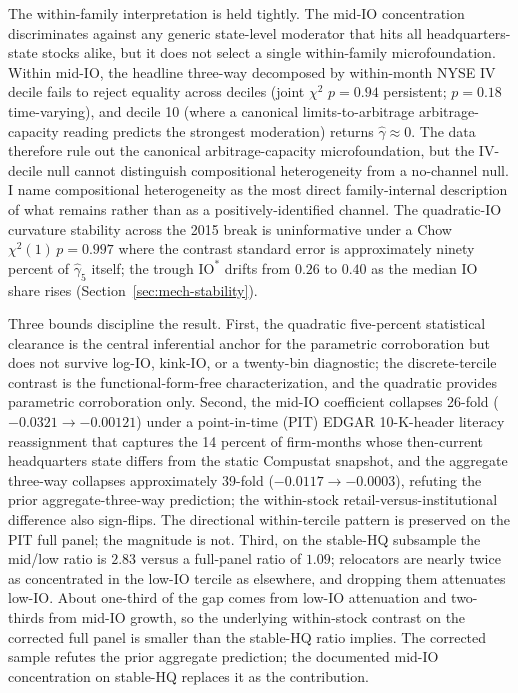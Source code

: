 The within-family interpretation is held tightly. The mid-IO concentration discriminates against any generic state-level moderator that hits all headquarters-state stocks alike, but it does not select a single within-family microfoundation. Within mid-IO, the headline three-way decomposed by within-month NYSE IV decile fails to reject equality across deciles (joint $\chi^{2}$ $p = 0.94$ persistent; $p = 0.18$ time-varying), and decile 10 (where a canonical limits-to-arbitrage arbitrage-capacity reading predicts the strongest moderation) returns $\hat\gamma \approx 0$. The data therefore rule out the canonical arbitrage-capacity microfoundation, but the IV-decile null cannot distinguish compositional heterogeneity from a no-channel null. I name compositional heterogeneity as the most direct family-internal description of what remains rather than as a positively-identified channel. The quadratic-IO curvature stability across the 2015 break is uninformative under a Chow $\chi^{2}(1)\,p = 0.997$ where the contrast standard error is approximately ninety percent of $\hat\gamma_{5}$ itself; the trough $\mathrm{IO}^{\ast}$ drifts from $0.26$ to $0.40$ as the median IO share rises (Section~\ref{sec:mech-stability}).

Three bounds discipline the result. First, the quadratic five-percent statistical clearance is the central inferential anchor for the parametric corroboration but does not survive log-IO, kink-IO, or a twenty-bin diagnostic; the discrete-tercile contrast is the functional-form-free characterization, and the quadratic provides parametric corroboration only. Second, the mid-IO coefficient collapses 26-fold ($-0.0321 \to -0.00121$) under a point-in-time (PIT) EDGAR 10-K-header literacy reassignment that captures the 14 percent of firm-months whose then-current headquarters state differs from the static Compustat snapshot, and the aggregate three-way collapses approximately 39-fold ($-0.0117 \to -0.0003$), refuting the prior aggregate-three-way prediction; the within-stock retail-versus-institutional difference also sign-flips. The directional within-tercile pattern is preserved on the PIT full panel; the magnitude is not. Third, on the stable-HQ subsample the mid/low ratio is $2.83$ versus a full-panel ratio of $1.09$; relocators are nearly twice as concentrated in the low-IO tercile as elsewhere, and dropping them attenuates low-IO. About one-third of the gap comes from low-IO attenuation and two-thirds from mid-IO growth, so the underlying within-stock contrast on the corrected full panel is smaller than the stable-HQ ratio implies. The corrected sample refutes the prior aggregate prediction; the documented mid-IO concentration on stable-HQ replaces it as the contribution.

